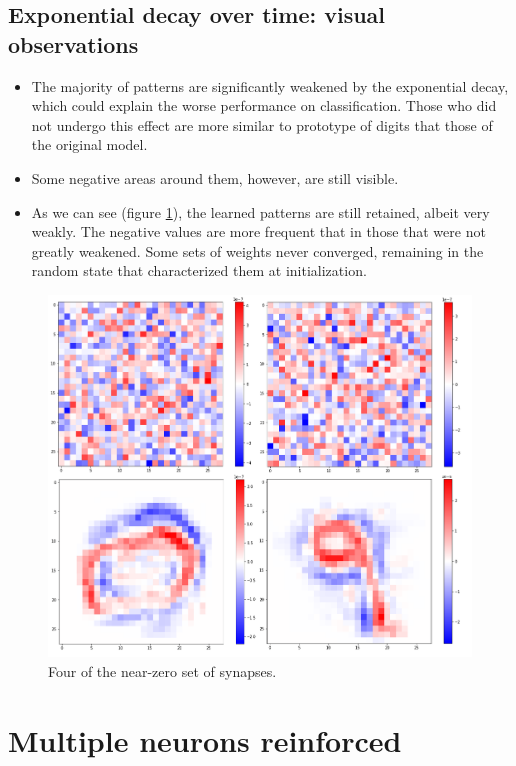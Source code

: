 \documentclass[a4paper]{report}
\begin{document}
\subsection{Exponential decay over time: visual observations}

\begin{itemize}
    \item The majority of patterns are significantly weakened by the exponential decay, which could explain the worse performance on classification. Those who did not undergo this effect are more similar to prototype of digits that those of the original model.
    \item Some negative areas around them, however, are still visible.
    \item As we can see (figure \ref{nearzero}), the learned patterns are still retained, albeit very weakly. The negative values are more frequent that in those that were not greatly weakened. Some sets of weights never converged, remaining in the random state that characterized them at initialization.
\end{itemize}


\begin{figure} [H]
\centering
\includegraphics [width=12cm ] {h/centodue.png}
\caption{Four of the near-zero set of synapses.}
\label{nearzero}
\end{figure}

\section{Multiple neurons reinforced}
\end{document}
